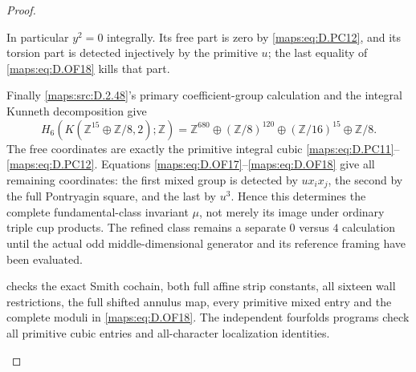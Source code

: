 \begin{proof}
\begin{enumerate}[label=\arabic*.,leftmargin=*]
In particular \(y^2=0\) integrally. Its free part is zero by
\eqref{maps:eq:D.PC12}, and its torsion part is detected injectively by the
primitive \(u\); the last equality of \eqref{maps:eq:D.OF18} kills that part.

Finally \ref{maps:src:D.2.48}'s primary coefficient-group calculation and
the integral Kunneth decomposition give
\[
 H_6(K(\mathbb Z^{15}\oplus\mathbb Z/8,2);\mathbb Z)
       =\mathbb Z^{680}\oplus(\mathbb Z/8)^{120}
                         \oplus(\mathbb Z/16)^{15}
                         \oplus\mathbb Z/8.              \tag{D.OF19}\label{maps:eq:D.OF19}
\]
The free coordinates are exactly the primitive integral cubic
\eqref{maps:eq:D.PC11}--\eqref{maps:eq:D.PC12}. Equations \eqref{maps:eq:D.OF17}--\eqref{maps:eq:D.OF18} give all
remaining coordinates: the first mixed group is detected by
\(ux_ix_j\), the second by the full Pontryagin square, and the
last by \(u^3\). Hence this determines the complete
fundamental-class invariant \(\mu\), not merely its image
under ordinary triple cup products.
The refined class remains a separate \(0\) versus \(4\)
calculation until the actual odd middle-dimensional generator
and its reference framing have been evaluated.

 checks the exact Smith
cochain, both full affine strip constants, all sixteen wall
restrictions, the full shifted annulus map, every primitive
mixed entry and the complete moduli in \eqref{maps:eq:D.OF18}.
The independent fourfolds programs check all primitive cubic
entries and all-character localization identities.
\end{enumerate}
\end{proof}
